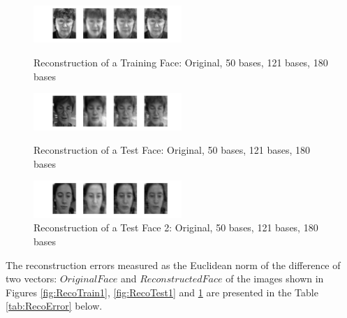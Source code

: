 \documentclass[10pt,twocolumn,letterpaper]{article}
\begin{document}
\begin{figure}[H]
\begin{center}
\includegraphics[width=0.5\textwidth]{../results/Train1_reco}

  \caption{Reconstruction of a Training Face: Original, 50 bases, 121 bases, 180 bases \label{fig:RecoTrain1}}
  
  \includegraphics[width=0.5\textwidth]{../results/Test1_reco}

  \caption{Reconstruction of a Test Face: Original, 50 bases, 121 bases, 180 bases \label{fig:RecoTest1}}

    \includegraphics[width=0.5\textwidth]{../results/Test2_reco}

  \caption{Reconstruction of a Test Face 2: Original, 50 bases, 121 bases, 180 bases \label{fig:RecoTest2}}

\end{center}
\end{figure}

The reconstruction errors measured as the Euclidean norm of the difference of two vectors: $Original Face$ and $Reconstructed Face$ of the images shown in Figures \ref{fig:RecoTrain1},  \ref{fig:RecoTest1} and \ref{fig:RecoTest2} are presented in the Table \ref{tab:RecoError} below.
\end{document}
